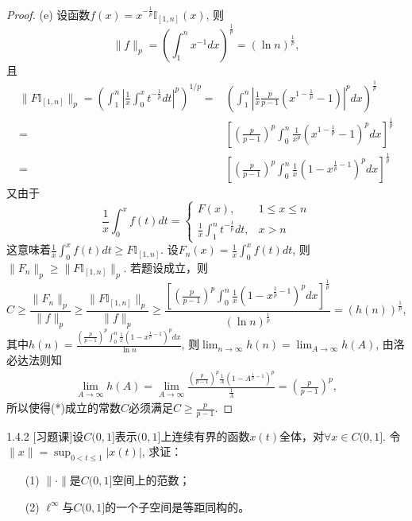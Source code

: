 \documentclass[a4paper,8pt]{ctexart}\textwidth 140mm \textheight 216mm
\newcommand{\8}{\infty}
\begin{document}
\begin{proof}
	(e) 设函数$f(x)=x^{-\frac{1}{p}}\mathbb{I}_{[1,n]}(x)$, 则
	$$\|f\|_p=(\int_1^n x^{-1}dx)^{\frac{1}{p}}=(\ln n)^{\frac{1}{p}},$$
	且
	\begin{equation*}
	\begin{split}
    \|F\mathbb{I}_{[1,n]}\|_p=(\int_1^n \left|\frac{1}{x}\int_0^x t^{-\frac{1}{p}}dt\right|^p)^{1/p}=&(\int_1^n\left|\frac{1}{x}\frac{p}{p-1}(x^{1-\frac{1}{p}}-1)\right|^pdx)^{\frac{1}{p}}\\
    =&\left[\left(\frac{p}{p-1}\right)^p\int_0^n \frac{1}{x^p}(x^{1-\frac{1}{p}}-1)^pdx\right]^{\frac{1}{p}}\\
    =&\left[\left(\frac{p}{p-1}\right)^p\int_0^n \frac{1}{x}(1-x^{\frac{1}{p}-1})^pdx\right]^{\frac{1}{p}}
	\end{split}	
	\end{equation*}
	又由于
	\begin{equation*}
		\frac{1}{x}\int_0^x f(t)dt=
		\begin{cases}
		F(x), & 1\leq x\leq n\\
		\frac{1}{x}\int_1^n t^{-\frac{1}{p}}dt, & x>n
		\end{cases}
	\end{equation*}
	这意味着$\frac{1}{x}\int_0^xf(t)dt\geq F\mathbb{I}_{[1,n]}$. 设$F_n(x)=\frac{1}{x}\int_0^xf(t)dt$, 则$\|F_n\|_p\geq \|F\mathbb{I}_{[1,n]}\|_p$. 若题设成立，则
	\begin{equation*}
		  C\geq \frac{\|F_n\|_p}{\|f\|_p}\geq \frac{\|F\mathbb{I}_{[1,n]}\|_p}{\|f\|_p}\geq \frac{\left[\left(\frac{p}{p-1}\right)^p\int_0^n \frac{1}{x}(1-x^{\frac{1}{p}-1})^pdx\right]^{\frac{1}{p}}}{(\ln n)^{\frac{1}{p}}}=(h(n))^{\frac{1}{p}},
	\end{equation*}
	其中$h(n)=\frac{\left(\frac{p}{p-1}\right)^p\int_0^n \frac{1}{x}(1-x^{\frac{1}{p}-1})^pdx}{\ln n}$, 则$\lim_{n\to\infty}h(n)=\lim_{A\to\infty}h(A)$, 由洛必达法则知
	\begin{equation*}
		\begin{split}
		\lim_{A\to\infty}h(A)=\lim_{A\to\infty}\frac{\left(\frac{p}{p-1}\right)^p\frac{1}{A}(1-A^{\frac{1}{p}-1})^p}{\frac{1}{A}}=\left(\frac{p}{p-1}\right)^p,
		\end{split}
	\end{equation*}
	所以使得(*)成立的常数$C$必须满足$C\geq \frac{p}{p-1}$.
\end{proof}
1.4.2 [习题课]设$C(0,1]$表示$(0,1]$上连续有界的函数$x(t)$全体，对$\forall x\in C(0,1]$. 令$\|x\|=\sup_{0<t\leq 1}|x(t)|$, 求证：
\begin{enumerate}
	\item[(1)] $\|\cdot\|$是$C(0,1]$空间上的范数；
	\item[(2)] $\ell^\infty$与$C(0,1]$的一个子空间是等距同构的。
\end{enumerate}
\end{document}
